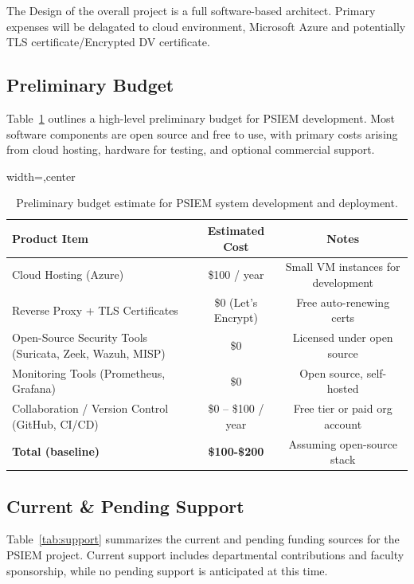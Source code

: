 The Design of the overall project is a full software-based architect. Primary expenses will be delagated to cloud environment, Microsoft Azure and potentially TLS certificate/Encrypted DV certificate.

\subsection{Preliminary Budget}

Table~\ref{tab:budget} outlines a high-level preliminary budget for PSIEM development. 
Most software components are open source and free to use, with primary costs 
arising from cloud hosting, hardware for testing, and optional commercial support.

\begin{table}[!htbp]
    \centering
    \begin{adjustbox}{width=\textwidth,center}
        \begin{tabular}{|l|c|c|}
        \hline
        \textbf{Product Item} & \textbf{Estimated Cost} & \textbf{Notes} \\
        \hline
        Cloud Hosting (Azure) & \$100 / year & Small VM instances for development \\
        \hline
        Reverse Proxy + TLS Certificates & \$0 (Let's Encrypt) & Free auto-renewing certs \\
        \hline
        Open-Source Security Tools (Suricata, Zeek, Wazuh, MISP) & \$0 & Licensed under open source \\
        \hline
        Monitoring Tools (Prometheus, Grafana) & \$0 & Open source, self-hosted \\
        \hline
        Collaboration / Version Control (GitHub, CI/CD) & \$0 -- \$100 / year & Free tier or paid org account \\
        \hline
        \textbf{Total (baseline)} & \textbf{\$100-\$200} & Assuming open-source stack \\
        \hline
        \end{tabular}
    \end{adjustbox}
\caption{Preliminary budget estimate for PSIEM system development and deployment.}
\label{tab:budget}
\end{table}

\subsection{Current \& Pending Support}
Table~\ref{tab:support} summarizes the current and pending funding sources 
for the PSIEM project. Current support includes departmental contributions 
and faculty sponsorship, while no pending support is anticipated at this time.

